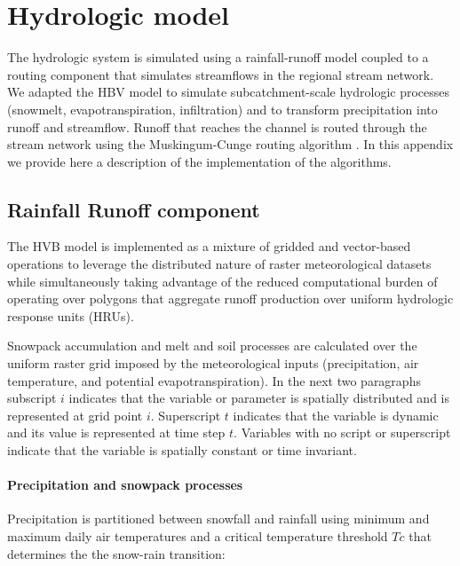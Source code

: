 \section{Hydrologic model}
\label{app:hydrologic_model}

The hydrologic system is simulated using a rainfall-runoff model coupled to a routing component that simulates streamflows in the regional stream network. We adapted the HBV model \citep{Bergstrom1995, Bergstrom1973} to simulate subcatchment-scale hydrologic processes (snowmelt, evapotranspiration, infiltration) and to transform precipitation into runoff and streamflow. Runoff that reaches the channel is routed through the stream network using the Muskingum-Cunge routing algorithm \cite{Chow1988}. In this appendix we provide here a description of the implementation of the algorithms.

\subsection{Rainfall Runoff component}

The HVB model \citep{Bergstrom1995, Bergstrom1973} is implemented as a mixture of gridded and vector-based operations to leverage the distributed nature of raster meteorological datasets while simultaneously taking advantage of the reduced computational burden of operating over polygons that aggregate runoff production over uniform hydrologic response units (HRUs). 

Snowpack accumulation and melt and soil processes are calculated over the uniform raster grid imposed by the meteorological inputs (precipitation, air temperature, and potential evapotranspiration). In the next two paragraphs subscript $i$ indicates that the variable or parameter is spatially distributed and is represented at grid point $i$. Superscript $t$ indicates that the variable is dynamic and its value is represented at time step $t$. Variables with no script or superscript indicate that the variable is spatially constant or time invariant. 

\paragraph{Precipitation and snowpack processes}      


Precipitation is partitioned between snowfall and rainfall using minimum and maximum daily air temperatures and a critical temperature threshold $Tc$ that determines the the snow-rain transition:

